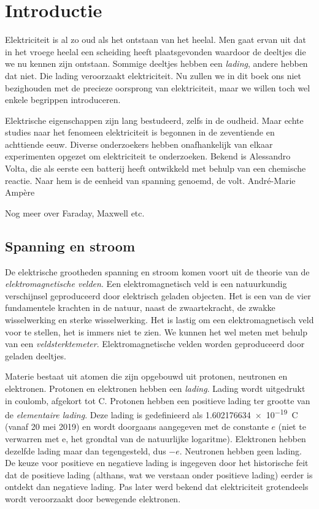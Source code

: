 \chapter{Introductie}
\label{cha:introductie}

Elektriciteit is al zo oud als het ontstaan van het heelal. Men gaat ervan uit dat in het vroege heelal een scheiding heeft plaatsgevonden waardoor de deeltjes die we nu kennen zijn ontstaan. Sommige deeltjes hebben een \textsl{lading}, andere hebben dat niet. Die lading veroorzaakt elektriciteit. Nu zullen we in dit boek ons niet bezighouden met de precieze oorsprong van elektriciteit, maar we willen toch wel enkele begrippen introduceren.

Elektrische eigenschappen zijn lang bestudeerd, zelfs in de oudheid. Maar echte studies naar het fenomeen elektriciteit is begonnen in de zeventiende en achttiende eeuw. Diverse onderzoekers hebben onafhankelijk van elkaar experimenten opgezet om elektriciteit te onderzoeken. Bekend is Alessandro Volta, die als eerste een batterij heeft ontwikkeld met behulp van een chemische reactie. Naar hem is de eenheid van spanning genoemd, de volt.  André-Marie Ampère 

Nog meer over Faraday, Maxwell etc.




\section{Spanning en stroom}
De elektrische grootheden spanning en stroom komen voort uit de theorie van de \textsl{elektromagnetische velden}. Een elektromagnetisch veld is een natuurkundig verschijnsel geproduceerd door elektrisch geladen objecten. Het is een van de vier fundamentele krachten in de natuur, naast de zwaartekracht, de zwakke wisselwerking en sterke wisselwerking. Het is lastig om een elektromagnetisch veld voor te stellen, het is immers niet te zien. We kunnen het wel meten met behulp van een \textsl{veldsterktemeter}. Elektromagnetische velden worden geproduceerd door geladen deeltjes.

Materie bestaat uit atomen die zijn opgebouwd uit protonen, neutronen en elektronen. Protonen en elektronen hebben een \textsl{lading}. Lading wordt uitgedrukt in coulomb, afgekort tot \si{\coulomb}. Protonen hebben een positieve lading ter grootte van de \textsl{elementaire lading}. Deze lading is gedefinieerd als \SI{1.602176634e-19}{\coulomb} (vanaf 20 mei 2019) en wordt doorgaans aangegeven met de constante $e$ (niet te verwarren met e, het grondtal van de natuurlijke logaritme). Elektronen hebben dezelfde lading maar dan tegengesteld, dus $-e$. Neutronen hebben geen lading. De keuze voor positieve en negatieve lading is ingegeven door het historische feit dat de positieve lading (althans, wat we verstaan onder positieve lading) eerder is ontdekt dan negatieve lading. Pas later werd bekend dat elektriciteit grotendeels wordt veroorzaakt door bewegende elektronen.


